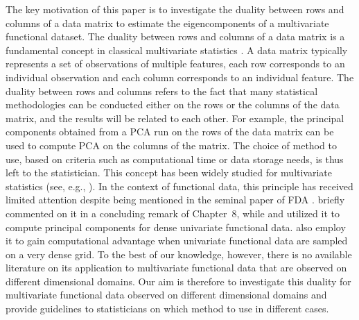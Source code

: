 The key motivation of this paper is to investigate the duality between rows and columns of a data matrix to estimate the eigencomponents of a multivariate functional dataset. The duality between rows and columns of a data matrix is a fundamental concept in classical multivariate statistics \citep{escofierTraitementSimultaneVariables1979,saportaSimultaneousAnalysisQualitative1990}. A data matrix typically represents a set of observations of multiple features, each row corresponds to an individual observation and each column corresponds to an individual feature. The duality between rows and columns refers to the fact that many statistical methodologies can be conducted either on the rows or the columns of the data matrix, and the results will be related to each other. For example, the principal components obtained from a PCA run on the rows of the data matrix can be used to compute PCA on the columns of the matrix. The choice of method to use, based on criteria such as computational time or data storage needs, is thus left to the statistician. This concept has been widely studied for multivariate statistics (see, e.g., \cite{pagesMultipleFactorAnalysis2014,hardleAppliedMultivariateStatistical2019}). In the context of functional data, this principle has received limited attention despite being mentioned in the seminal paper of FDA \citep{ramsayWhenDataAre1982a}. \cite{ramsayFunctionalDataAnalysis2005} briefly commented on it in a concluding remark of Chapter~8, while \cite{kneipInferenceDensityFamilies2001} and \cite{benkoCommonFunctionalPrincipal2009} utilized it to compute principal components for dense univariate functional data. \cite{chenQuantifyingInfiniteDimensionalData2017} also employ it to gain computational advantage when univariate functional data are sampled on a very dense grid. To the best of our knowledge, however, there is no available literature on its application to multivariate functional data that are observed on different dimensional domains. Our aim is therefore to investigate this duality for multivariate functional data observed on different dimensional domains and provide guidelines to statisticians on which method to use in different cases.

